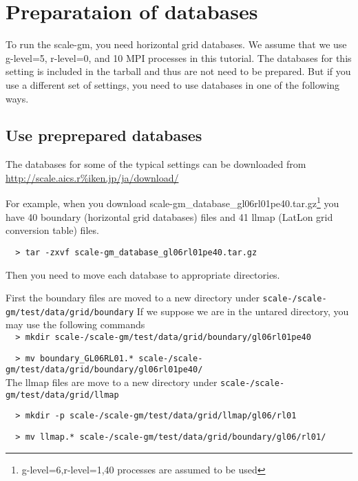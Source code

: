 \section{Preparataion of databases}

To run the scale-gm, you need horizontal grid databases. We assume that 
we use g-level=5, r-level=0, and 10 MPI processes in this tutorial.
The databases for this setting is included in the tarball and 
thus are not need to be prepared. 
But if you use a different set of settings, you need to use databases 
in one of the following ways.
\subsection{Use preprepared databases}
The databases for some of the typical settings can be downloaded from 
\noindent \url{http://scale.aics.r%iken.jp/ja/download/}

For example, when you download
scale-gm\_database\_gl06rl01pe40.tar.gz\footnote{g-level=6,r-level=1,40
  processes are assumed to be used}
you have 40 boundary (horizontal grid databases) files and 41 llmap (LatLon
grid conversion table) files. 
\begin{verbatim}
  > tar -zxvf scale-gm_database_gl06rl01pe40.tar.gz
\end{verbatim}

\noindent Then you need to move each database to appropriate directories.

\noindent First the boundary files are moved to a new directory under 
\texttt{scale-{\version}/scale-gm/test/data/grid/boundary}
If we suppose we are in the untared directory, you may use the following commands
\\

\verb|  > mkdir scale-|{\version}\verb|/scale-gm/test/data/grid/boundary/gl06rl01pe40|

\verb|  > mv boundary_GL06RL01.* scale-|{\version}\verb|/scale-gm/test/data/grid/boundary/gl06rl01pe40/|
\\

\noindent The llmap files are move to a new directory under 
\texttt{scale-{\version}/scale-gm/test/data/grid/llmap}

\verb|  > mkdir -p scale-|{\version}\verb|/scale-gm/test/data/grid/llmap/gl06/rl01|

\verb|  > mv llmap.* scale-|{\version}\verb|/scale-gm/test/data/grid/boundary/gl06/rl01/| \\


